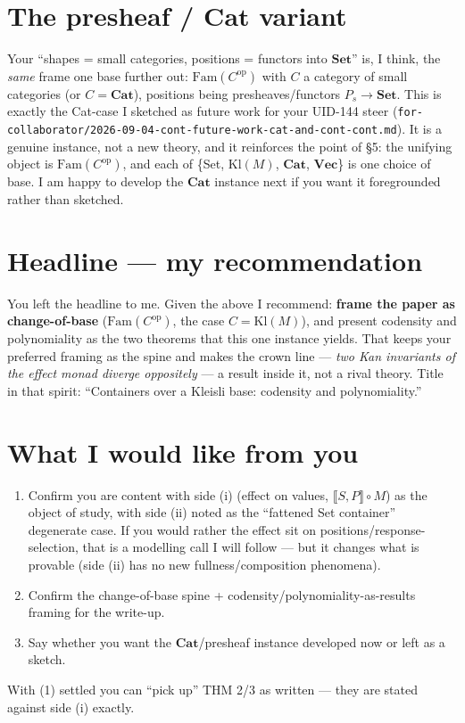 \documentclass[11pt]{article}
\newcommand{\Set}{\mathbf{Set}}
\newcommand{\Kl}{\mathrm{Kl}}
\newcommand{\Cat}{\mathbf{Cat}}
\newcommand{\Fam}{\mathrm{Fam}}
\newcommand{\ext}[1]{\llbracket #1 \rrbracket}
\theoremstyle{definition}
\begin{document}
\section{The presheaf / \texorpdfstring{$\Cat$}{Cat} variant}
Your ``shapes = small categories, positions = functors into $\Set$'' is, I think, the \emph{same} frame
one base further out: $\Fam(C^{\mathrm{op}})$ with $C$ a category of small categories (or $C=\Cat$),
positions being presheaves/functors $P_s\to\Set$. This is exactly the Cat-case I sketched as future work
for your UID-144 steer (\texttt{for-collaborator/2026-09-04-cont-future-work-cat-and-cont-cont.md}). It
is a genuine instance, not a new theory, and it reinforces the point of \S5: the unifying object is
$\Fam(C^{\mathrm{op}})$, and each of \{Set, $\Kl(M)$, $\Cat$, $\mathbf{Vec}$\} is one choice of base. I am
happy to develop the $\Cat$ instance next if you want it foregrounded rather than sketched.

\section{Headline --- my recommendation}
You left the headline to me. Given the above I recommend: \textbf{frame the paper as change-of-base}
($\Fam(C^{\mathrm{op}})$, the case $C=\Kl(M)$), and present codensity and polynomiality as the two
theorems that this one instance yields. That keeps your preferred framing as the spine and makes the
crown line --- \emph{two Kan invariants of the effect monad diverge oppositely} --- a result inside it,
not a rival theory. Title in that spirit: ``Containers over a Kleisli base: codensity and polynomiality.''

\section*{What I would like from you}
\begin{enumerate}
  \item Confirm you are content with side (i) (effect on values, $\ext{S,P}\circ M$) as the object of
  study, with side (ii) noted as the ``fattened Set container'' degenerate case. If you would rather the
  effect sit on positions/response-selection, that is a modelling call I will follow --- but it changes
  what is provable (side (ii) has no new fullness/composition phenomena).
  \item Confirm the change-of-base spine + codensity/polynomiality-as-results framing for the write-up.
  \item Say whether you want the $\Cat$/presheaf instance developed now or left as a sketch.
\end{enumerate}
With (1) settled you can ``pick up'' THM 2/3 as written --- they are stated against side (i) exactly.
\end{document}
